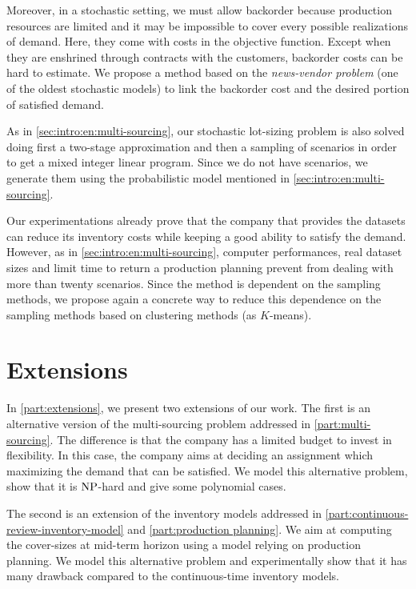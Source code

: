 Moreover, in a stochastic setting, we must allow backorder because production resources are limited and it may be impossible to cover every possible realizations of demand.
Here, they come with costs in the objective function.
Except when they are enshrined through contracts with the customers, backorder costs can be hard to estimate.
We propose a method based on the \emph{news-vendor problem} (one of the oldest stochastic models) to link the backorder cost and the desired portion of satisfied demand.


As in \cref{sec:intro:en:multi-sourcing}, our stochastic lot-sizing problem is also solved doing first a two-stage approximation and then a sampling of scenarios in order to get a mixed integer linear program.
Since we do not have scenarios, we generate them using the probabilistic model mentioned in \cref{sec:intro:en:multi-sourcing}.


\medskip


Our experimentations already prove that the company that provides the datasets can reduce its inventory costs while keeping a good ability to satisfy the demand.
However, as in \cref{sec:intro:en:multi-sourcing}, computer performances, real dataset sizes and limit time to return a production planning prevent from dealing with more than twenty scenarios.
Since the method is dependent on the sampling methods, we propose again a concrete way to reduce this dependence on the sampling methods based on clustering methods (as $K$-means).


\section{Extensions}


In \cref{part:extensions}, we present two extensions of our work.
The first is an alternative version of the multi-sourcing problem addressed in \cref{part:multi-sourcing}.
The difference is that the company has a limited budget to invest in flexibility.
In this case, the company aims at deciding an assignment which maximizing the demand that can be satisfied.
We model this alternative problem, show that it is $\operatorname{NP}$-hard and give some polynomial cases.


The second is an extension of the inventory models addressed in \cref{part:continuous-review-inventory-model} and \ref{part:production planning}.
We aim at computing the cover-sizes at mid-term horizon using a model relying on production planning.
We model this alternative problem and experimentally show that it has many drawback compared to the continuous-time inventory models.

